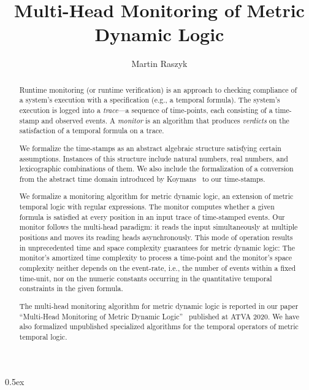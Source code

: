 \documentclass[10pt,a4paper]{article}
\begin{document}
\title{Multi-Head Monitoring of Metric Dynamic Logic}
\author{Martin Raszyk}

\maketitle

\begin{abstract}
Runtime monitoring (or runtime verification) is an approach to checking
compliance of a system's execution with a specification (e.g., a temporal
formula). The system's execution is logged into a \emph{trace}---a sequence of
time-points, each consisting of a time-stamp and observed events. A
\emph{monitor} is an algorithm that produces \emph{verdicts} on the satisfaction
of a temporal formula on a trace.

We formalize the time-stamps as an abstract algebraic structure satisfying
certain assumptions. Instances of this structure include natural numbers, real
numbers, and lexicographic combinations of them. We also include the
formalization of a conversion from the abstract time domain introduced by
Koymans~\cite{DBLP:journals/rts/Koymans90} to our time-stamps.

We formalize a monitoring algorithm for metric dynamic logic, an extension of
metric temporal logic with regular expressions. The monitor computes whether a
given formula is satisfied at every position in an input trace of time-stamped
events. Our monitor follows the multi-head paradigm: it reads the input
simultaneously at multiple positions and moves its reading heads asynchronously.
This mode of operation results in unprecedented time and space complexity
guarantees for metric dynamic logic: The monitor's amortized time complexity to
process a time-point and the monitor's space complexity neither depends on the
event-rate, i.e., the number of events within a fixed time-unit, nor on the
numeric constants occurring in the quantitative temporal constraints in the
given formula.

The multi-head monitoring algorithm for metric dynamic logic is reported in our
paper ``Multi-Head Monitoring of Metric Dynamic
Logic''~\cite{DBLP:conf/atva/RaszykBT20} published at ATVA 2020. We have also
formalized unpublished specialized algorithms for the temporal operators of
metric temporal logic.
\end{abstract}

\tableofcontents

\parindent 0pt\parskip 0.5ex





\end{document}
